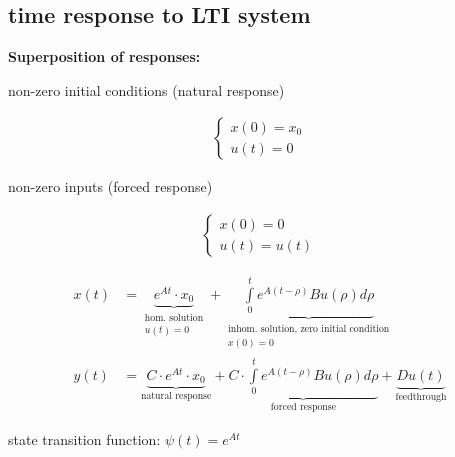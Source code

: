 \subsection{time response to LTI system}
    \begin{center}
        \textbf{Superposition of responses:}
    \end{center}
    
    \begin{minipage}{0.49\linewidth}
        \begin{minipage}{0.49\linewidth}
            non-zero initial conditions (natural response)
        \end{minipage}
        \begin{minipage}{0.49\linewidth}
            \begin{align*}
                \begin{cases}
                    x(0) = x_0\\
                    u(t) = 0
                \end{cases}
            \end{align*}
        \end{minipage}
    \end{minipage}
    \begin{minipage}{0.49\linewidth}
        \begin{minipage}{0.44\linewidth}
            non-zero inputs (forced response)
        \end{minipage}
        \begin{minipage}{0.54\linewidth}
            \begin{align*}
                \begin{cases}
                    x(0) = 0\\
                    u(t) = u(t)
                \end{cases}
            \end{align*}
        \end{minipage}
    \end{minipage}
    \begin{align*}
        x(t) &= \underbrace{e^{At} \cdot x_0}_{\substack{\text{hom. solution}\\ u(t) = 0}} + \underbrace{\int\limits_0^t e^{A (t-\rho)} B u(\rho) d\rho}_{\substack{\text{inhom. solution, zero initial condition}\\ x(0) = 0}}\\
        y(t) &= \underbrace{C \cdot e^{At} \cdot x_0}_{\text{natural response}} + \underbrace{C \cdot \int\limits_0^t e^{A (t-\rho)} B u(\rho) d\rho}_{\text{forced response}} + \underbrace{D u(t)}_{\text{feedthrough}}
    \end{align*}

    state transition function: $\psi(t) = e^{At}$